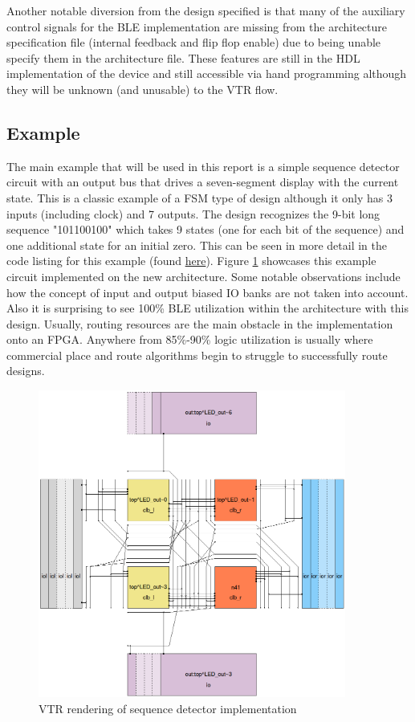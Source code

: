 \documentclass[12pt]{article}
\begin{document}
Another notable diversion from the design specified is that many of the auxiliary control 
signals for the BLE implementation are missing from the architecture specification file
(internal feedback and flip flop enable) due to being unable specify them in the architecture file.
These features are still in the HDL implementation of the device and still accessible via hand
programming although they will be unknown (and unusable) to the VTR flow.

\subsection{Example} \label{vtr_ex}

The main example that will be used in this report is a simple sequence detector circuit
with an output bus that drives a seven-segment display with the current state. This is
a classic example of a FSM type of design although it only has 3 inputs (including clock)
and 7 outputs. The design recognizes the 9-bit long sequence "101100100" which takes
9 states (one for each bit of the sequence) and one additional state for an initial zero.
This can be seen in more detail in the code listing for this example (found
\href{https://github.com/JosephPrachar/fpga/blob/master/vtr/seq_det.v}{here}).
Figure \ref{fig:seq_det} showcases this example circuit implemented on the new architecture.
Some notable observations include how the concept of input and output biased IO banks
are not taken into account. Also it is surprising to see 100\% BLE utilization
within the architecture with this design. Usually, routing resources are the main
obstacle in the implementation onto an FPGA. Anywhere from 85\%-90\% logic utilization
is usually where commercial place and route algorithms begin to struggle to successfully
route designs.

\begin{figure}[H]
    \centering
    \includegraphics[width=0.9\textwidth]{seq_det}
    \caption{VTR rendering of sequence detector implementation}
    \label{fig:seq_det}
\end{figure}
\end{document}
